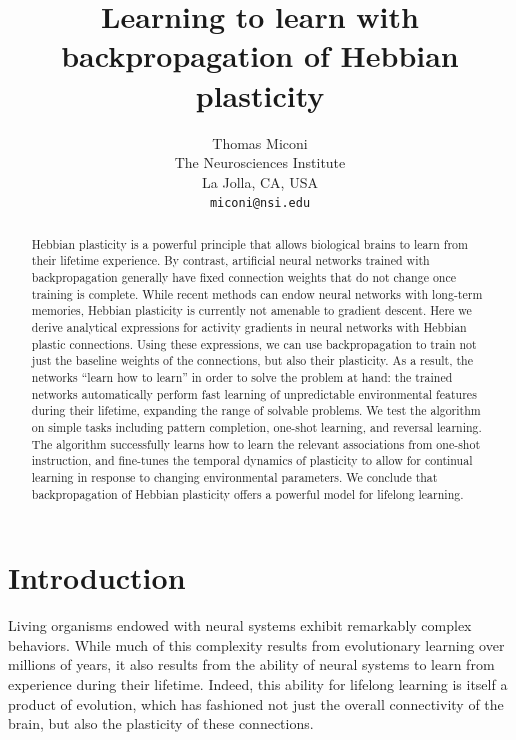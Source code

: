 \documentclass{article}
\title{Learning to learn with backpropagation of Hebbian plasticity}
\author{
    Thomas Miconi\\
    The Neurosciences Institute\\
    La Jolla, CA, USA\\
    \texttt{miconi@nsi.edu}
}
\begin{document}
\maketitle

\begin{abstract}

Hebbian plasticity is a powerful principle that allows biological brains to
learn from their lifetime experience.  By contrast, artificial neural networks
trained with backpropagation generally have fixed connection weights that do
not change once training is complete.  While recent methods can endow neural
networks with long-term memories, Hebbian plasticity is currently not amenable
to gradient descent. Here we derive analytical expressions for activity
gradients in neural networks with Hebbian plastic connections. Using these
expressions, we can use backpropagation to train not just the baseline weights
of the connections, but also their plasticity. As a result, the networks
``learn how to learn''  in order to solve the problem at hand: the trained
networks automatically perform fast learning of unpredictable environmental
features during their lifetime, expanding the range of solvable problems. We
test the algorithm on simple tasks including pattern completion, one-shot
learning, and reversal learning.  The algorithm successfully learns how to
learn the relevant associations from one-shot instruction, and fine-tunes the
temporal dynamics of plasticity to allow for continual learning in response to
changing environmental parameters. We conclude that backpropagation of Hebbian
plasticity offers a powerful model for lifelong learning.

\end{abstract}


\section{Introduction}

Living organisms endowed with neural systems exhibit remarkably complex behaviors.
While much of this complexity results from evolutionary learning over millions
of years, it also results from the ability of neural systems to learn from
experience during their lifetime. Indeed, this ability for lifelong learning is
itself a product of evolution, which has fashioned not just the overall
connectivity of the brain, but also the plasticity of these connections. 
\end{document}

